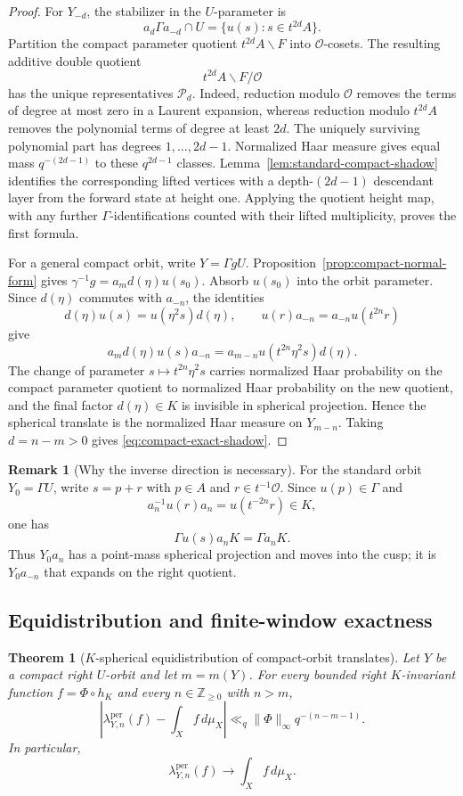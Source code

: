 \documentclass[11pt]{amsart}
\theoremstyle{definition}
\newtheorem{remark}[definition]{Remark}
\theoremstyle{plain}
\newtheorem{theorem}[definition]{Theorem}
\newcommand{\cO}{\mathcal O}
\newcommand{\ZZ}{\mathbb Z}
\begin{document}
\begin{proof}
For \(Y_{-d}\), the stabilizer in the \(U\)-parameter is
\[
a_d\Gamma a_{-d}\cap U=\{u(s):s\in t^{2d}A\}.
\]
Partition the compact parameter quotient \(t^{2d}A\backslash F\) into
\(\cO\)-cosets.  The resulting additive double quotient
\[
t^{2d}A\backslash F/\cO
\]
has the unique representatives \(\mathcal P_d\).  Indeed, reduction modulo
\(\cO\) removes the terms of degree at most zero in a Laurent expansion,
whereas reduction modulo \(t^{2d}A\) removes the polynomial terms of degree at
least \(2d\).  The uniquely surviving polynomial part has degrees
\(1,\ldots,2d-1\).  Normalized Haar measure gives equal mass
\(q^{-(2d-1)}\) to these \(q^{2d-1}\) classes.
Lemma~\ref{lem:standard-compact-shadow} identifies the corresponding lifted
vertices with a depth-\((2d-1)\) descendant layer from the forward state at
height one.  Applying the quotient height map, with any further
\(\Gamma\)-identifications counted with their lifted multiplicity, proves the
first formula.

For a general compact orbit, write \(Y=\Gamma gU\).  Proposition~\ref{prop:compact-normal-form} gives
\(\gamma^{-1}g=a_m d(\eta)u(s_0)\).  Absorb \(u(s_0)\) into the orbit
parameter.  Since \(d(\eta)\) commutes with \(a_{-n}\), the identities
\[
d(\eta)u(s)=u(\eta^2s)d(\eta),
\qquad
u(r)a_{-n}=a_{-n}u(t^{2n}r)
\]
give
\[
a_m d(\eta)u(s)a_{-n}
 =a_{m-n}u(t^{2n}\eta^2s)d(\eta).
\]
The change of parameter \(s\mapsto t^{2n}\eta^2s\) carries normalized Haar
probability on the compact parameter quotient to normalized Haar probability
on the new quotient, and the final factor \(d(\eta)\in K\) is invisible in
spherical projection.  Hence the spherical translate is the normalized Haar
measure on \(Y_{m-n}\).  Taking \(d=n-m>0\) gives
\eqref{eq:compact-exact-shadow}.
\end{proof}

\begin{remark}[Why the inverse direction is necessary]
For the standard orbit \(Y_0=\Gamma U\), write
\(s=p+r\) with \(p\in A\) and \(r\in t^{-1}\cO\).  Since \(u(p)\in\Gamma\) and
\[
a_n^{-1}u(r)a_n=u(t^{-2n}r)\in K,
\]
one has
\[
\Gamma u(s)a_nK=\Gamma a_nK.
\]
Thus \(Y_0a_n\) has a point-mass spherical projection and moves into the cusp;
it is \(Y_0a_{-n}\) that expands on the right quotient.
\end{remark}

\subsection{Equidistribution and finite-window exactness}
\begin{theorem}[\(K\)-spherical equidistribution of compact-orbit translates]
\label{thm:compact-eq}
Let \(Y\) be a compact right \(U\)-orbit and let \(m=m(Y)\).  For every bounded
right \(K\)-invariant function \(f=\Phi\circ h_K\) and every
\(n\in\ZZ_{\ge0}\) with \(n>m\),
\[
\left|\lambda_{Y,n}^{\mathrm{per}}(f)-\int_Xf\,d\mu_X\right|
 \ll_q \|\Phi\|_\infty q^{-(n-m-1)}.
\]
In particular,
\[
\lambda_{Y,n}^{\mathrm{per}}(f)\longrightarrow\int_Xf\,d\mu_X.
\]
\end{theorem}
\end{document}
